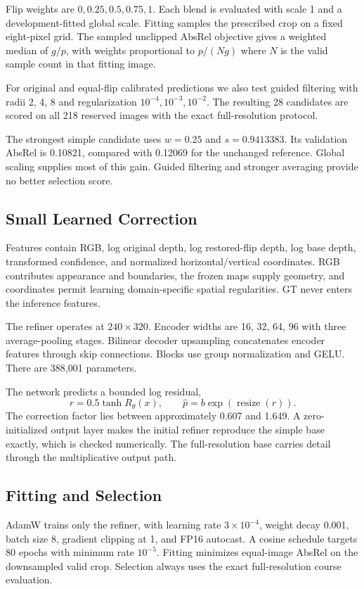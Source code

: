 \documentclass[10pt,twocolumn,letterpaper]{article}
\begin{document}
Flip weights are $0,0.25,0.5,0.75,1$. Each blend is evaluated with scale 1 and a development-fitted global scale. Fitting samples the prescribed crop on a fixed eight-pixel grid. The sampled unclipped AbsRel objective gives a weighted median of $g/p$, with weights proportional to $p/(Ng)$ where $N$ is the valid sample count in that fitting image.

For original and equal-flip calibrated predictions we also test guided filtering with radii 2, 4, 8 and regularization $10^{-4},10^{-3},10^{-2}$. The resulting 28 candidates are scored on all 218 reserved images with the exact full-resolution protocol.

The strongest simple candidate uses $w=0.25$ and $s=0.9413383$. Its validation AbsRel is 0.10821, compared with 0.12069 for the unchanged reference. Global scaling supplies most of this gain. Guided filtering and stronger averaging provide no better selection score.

\subsection{Small Learned Correction}
Features contain RGB, log original depth, log restored-flip depth, log base depth, transformed confidence, and normalized horizontal/vertical coordinates. RGB contributes appearance and boundaries, the frozen maps supply geometry, and coordinates permit learning domain-specific spatial regularities. GT never enters the inference features.

The refiner operates at $240\times320$. Encoder widths are 16, 32, 64, 96 with three average-pooling stages. Bilinear decoder upsampling concatenates encoder features through skip connections. Blocks use group normalization and GELU. There are 388,001 parameters.

The network predicts a bounded log residual,
\begin{equation}
r=0.5\tanh R_\theta(x), \qquad
\widehat p=b\exp(\operatorname{resize}(r)).
\end{equation}
The correction factor lies between approximately 0.607 and 1.649. A zero-initialized output layer makes the initial refiner reproduce the simple base exactly, which is checked numerically. The full-resolution base carries detail through the multiplicative output path.

\subsection{Fitting and Selection}
AdamW trains only the refiner, with learning rate $3\times10^{-4}$, weight decay 0.001, batch size 8, gradient clipping at 1, and FP16 autocast. A cosine schedule targets 80 epochs with minimum rate $10^{-5}$. Fitting minimizes equal-image AbsRel on the downsampled valid crop. Selection always uses the exact full-resolution course evaluation.
\end{document}
